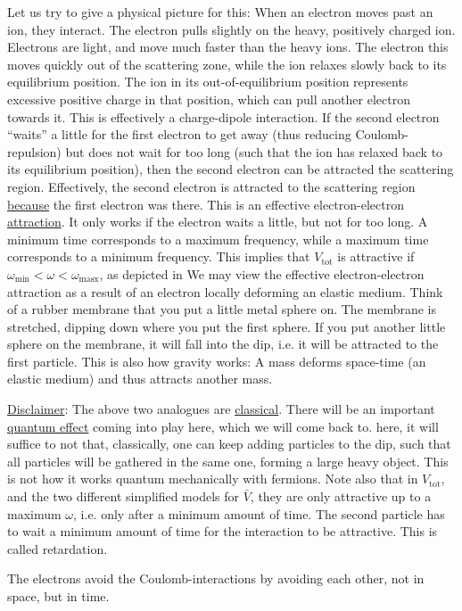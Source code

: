 Let us try to give a physical picture for this: When an electron moves past an ion, they interact. The electron pulls slightly on the heavy, positively charged ion. Electrons are light, and move much faster than the heavy ions. The electron this moves quickly out of the scattering zone, while the ion relaxes slowly back to its equilibrium position. The ion in its out-of-equilibrium position represents excessive positive charge in that position, which can pull another electron towards it. This is effectively a charge-dipole interaction. If the second electron ``waits'' a little for the first electron to get away (thus reducing Coulomb-repulsion) but does not wait for too long (such that the ion has relaxed back to its equilibrium position), then the second electron can be attracted the scattering region. Effectively, the second electron is attracted to the scattering region \underline{because} the first electron was there. This is an effective electron-electron \underline{attraction}. It only works if the electron waits a little, but not for too long. 
A minimum time corresponds to a maximum frequency, while a maximum time corresponds to a minimum frequency. This implies that $V_{\text{tot}}$ is attractive if $\omega_\text{min} <\omega<\omega_\text{masx}$, as depicted in 
We may view the effective electron-electron attraction as a result of an electron locally deforming an elastic medium. Think of a rubber membrane that you put a little metal sphere on. The membrane is stretched, dipping down where you put the first sphere. If you put another little sphere on the membrane, it will fall into the dip, i.e. it will be attracted to the first particle.
This is also how gravity works: A mass deforms space-time (an elastic medium) and thus attracts another mass. 

\underline{Disclaimer}: The above two analogues are \underline{classical}. There will be an important \underline{quantum effect} coming into play here, which we will come back to. here, it will suffice to not that, classically, one can keep adding particles to the dip, such that all particles will be gathered in the same one, forming a large heavy object. This is not how it works quantum mechanically with fermions. Note also that in $V_{\text{tot}}$, and the two different simplified models for $\bar V$, they are only attractive up to a maximum $\omega$, i.e. only after a minimum amount of time. The second particle has to wait a minimum amount of time for the interaction to be attractive. This is called retardation. 
\begin{tcolorbox}
	The electrons avoid the Coulomb-interactions by avoiding each other, not in space, but in time. 
\end{tcolorbox}


